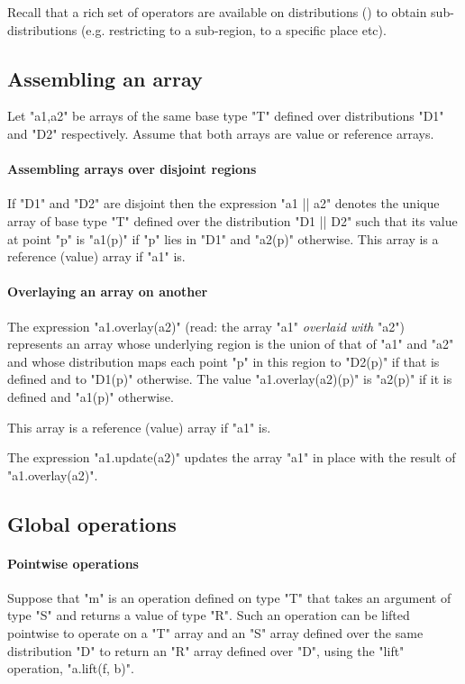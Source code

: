 Recall that a rich set of operators are available on distributions
() to obtain sub-distributions
(e.g. restricting to a sub-region, to a specific place etc).

\subsection{Assembling an array}
Let \xcd"a1,a2" be arrays of the same base type \xcd"T" defined over
distributions \xcd"D1" and \xcd"D2" respectively. Assume that both
arrays are value or reference arrays. 
\paragraph{Assembling arrays over disjoint regions}

If \xcd"D1" and \xcd"D2" are disjoint then the expression \xcd"a1 || a2" denotes the unique array of base type \xcd"T" defined over the
distribution \xcd"D1 || D2" such that its value at point \xcd"p" is
\xcd"a1(p)" if \xcd"p" lies in \xcd"D1" and \xcd"a2(p)"
otherwise. This array is a reference (value) array if \xcd"a1" is.

\paragraph{Overlaying an array on another}
The expression
\xcd"a1.overlay(a2)" (read: the array \xcd"a1" {\em overlaid with} \xcd"a2")
represents an array whose underlying region is the union of that of
\xcd"a1" and \xcd"a2" and whose distribution maps each point \xcd"p"
in this region to \xcd"D2(p)" if that is defined and to \xcd"D1(p)"
otherwise. The value \xcd"a1.overlay(a2)(p)" is \xcd"a2(p)" if it is defined and \xcd"a1(p)" otherwise.

This array is a reference (value) array if \xcd"a1" is.

The expression \xcd"a1.update(a2)" updates the array \xcd"a1" in place
with the result of \xcd"a1.overlay(a2)".



\subsection{Global operations }
\paragraph{Pointwise operations}\label{ArrayPointwise}
Suppose that \xcd"m" is an operation defined on type \xcd"T" that
takes an argument of type \xcd"S" and returns a value of type
\xcd"R". Such an operation can be lifted pointwise to operate on a \xcd"T"
array and an \xcd"S" array defined over the same distribution \xcd"D"
to return an \xcd"R" array defined over \xcd"D", using the
\xcd"lift" operation, \xcd"a.lift(f, b)".


